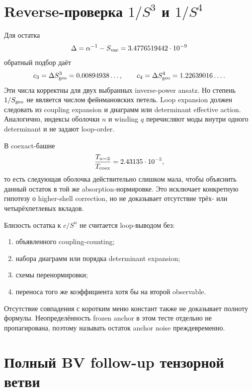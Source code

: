 \section{Reverse-проверка \(1/S^3\) и \(1/S^4\)}

Для остатка
\begin{equation}
 \Delta=\alpha^{-1}-S_{\rm vac}
 =3.4776519442\cdot10^{-9}
\end{equation}
обратный подбор даёт
\begin{equation}
 c_3=\Delta S_{\rm geo}^3=0.00894938\ldots,
 \qquad
 c_4=\Delta S_{\rm geo}^4=1.22639016\ldots.
\end{equation}
Эти числа корректны для двух выбранных inverse-power ansatz. Но степень
\(1/S_{\rm geo}\) не является числом фейнмановских петель. Loop expansion
должен следовать из coupling expansion и диаграмм или determinant
effective action. Аналогично, индексы оболочки \(n\) и winding \(q\)
перечисляют моды внутри одного determinant и не задают loop-order.

В coexact-башне
\begin{equation}
 \frac{T_{n=3}}{T_{\rm coex}}
 =2.43135\cdot10^{-5},
\end{equation}
то есть следующая оболочка действительно слишком мала, чтобы объяснить
данный остаток в той же absorption-нормировке. Это исключает конкретную
гипотезу о higher-shell correction, но не доказывает отсутствие
трёх- или четырёхпетлевых вкладов.

\begin{nogocriterion}
Близость остатка к \(c/S^n\) не считается loop-выводом без:
\begin{enumerate}
 \item объявленного coupling-counting;
 \item набора диаграмм или порядка determinant expansion;
 \item схемы перенормировки;
 \item переноса того же коэффициента хотя бы на второй observable.
\end{enumerate}
Отсутствие совпадения с коротким меню констант также не доказывает полноту
формулы. Неопределённость frozen anchor в этом тесте отдельно не
пропагирована, поэтому называть остаток anchor noise преждевременно.
\end{nogocriterion}

\section{Полный BV follow-up тензорной ветви}

